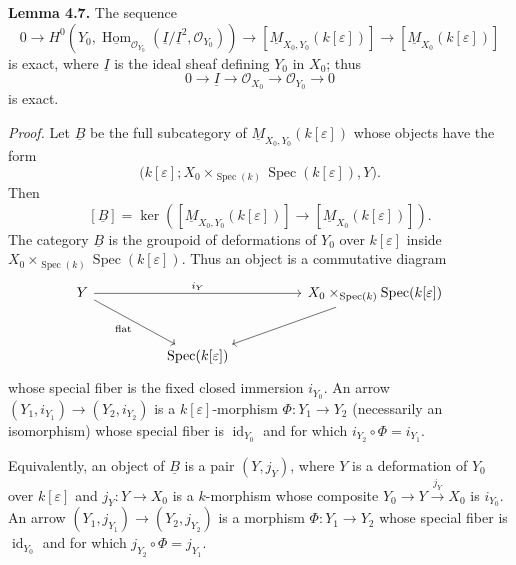 
\medskip
\noindent\textbf{Lemma 4.7.}
The sequence
\[
0\longrightarrow
H^0\!\left(
Y_0,
\underline{\operatorname{Hom}}_{\mathcal O_{Y_0}}
(\underline I/\underline I^2,\mathcal O_{Y_0})
\right)
\longrightarrow[\underline M_{X_0,Y_0}(k[\varepsilon])]
\longrightarrow[\underline M_{X_0}(k[\varepsilon])]
\]
is exact, where $\underline I$ is the ideal sheaf defining $Y_0$ in
$X_0$; thus
\[
0\longrightarrow\underline I\longrightarrow\mathcal O_{X_0}
\longrightarrow\mathcal O_{Y_0}\longrightarrow0
\]
is exact.


\medskip
\noindent\textit{Proof.}
Let $\underline B$ be the full subcategory of
$\underline M_{X_0,Y_0}(k[\varepsilon])$ whose objects have the form
\[
\bigl(k[\varepsilon];
X_0\times_{\operatorname{Spec}(k)}\operatorname{Spec}(k[\varepsilon]),
Y\bigr).
\]
Then
\[
[\underline B]
=\ker\!\left(
[\underline M_{X_0,Y_0}(k[\varepsilon])]
\longrightarrow[\underline M_{X_0}(k[\varepsilon])]
\right).
\]
The category $\underline B$ is the groupoid of deformations of $Y_0$
over $k[\varepsilon]$ inside
$X_0\times_{\operatorname{Spec}(k)}\operatorname{Spec}(k[\varepsilon])$.
Thus an object is a commutative diagram
\[
\begin{tikzcd}[column sep=huge,row sep=large]
Y \arrow[rr,"i_Y"] \arrow[dr,"\mathrm{flat}"']
&& X_0\times_{\operatorname{Spec}(k)}
   \operatorname{Spec}(k[\varepsilon]) \arrow[dl] \\
& \operatorname{Spec}(k[\varepsilon]) &
\end{tikzcd}
\]
whose special fiber is the fixed closed immersion $i_{Y_0}$. An
arrow $(Y_1,i_{Y_1})\longrightarrow(Y_2,i_{Y_2})$ is a
$k[\varepsilon]$-morphism $\Phi:Y_1\longrightarrow Y_2$ (necessarily
an isomorphism) whose special fiber is $\operatorname{id}_{Y_0}$ and
for which $i_{Y_2}\circ\Phi=i_{Y_1}$.

Equivalently, an object of $\underline B$ is a pair $(Y,j_Y)$, where
$Y$ is a deformation of $Y_0$ over $k[\varepsilon]$ and
$j_Y:Y\longrightarrow X_0$ is a $k$-morphism whose composite
$Y_0\longrightarrow Y\xrightarrow{j_Y}X_0$ is $i_{Y_0}$. An arrow
$(Y_1,j_{Y_1})\longrightarrow(Y_2,j_{Y_2})$ is a morphism
$\Phi:Y_1\longrightarrow Y_2$ whose special fiber is
$\operatorname{id}_{Y_0}$ and for which
$j_{Y_2}\circ\Phi=j_{Y_1}$.

